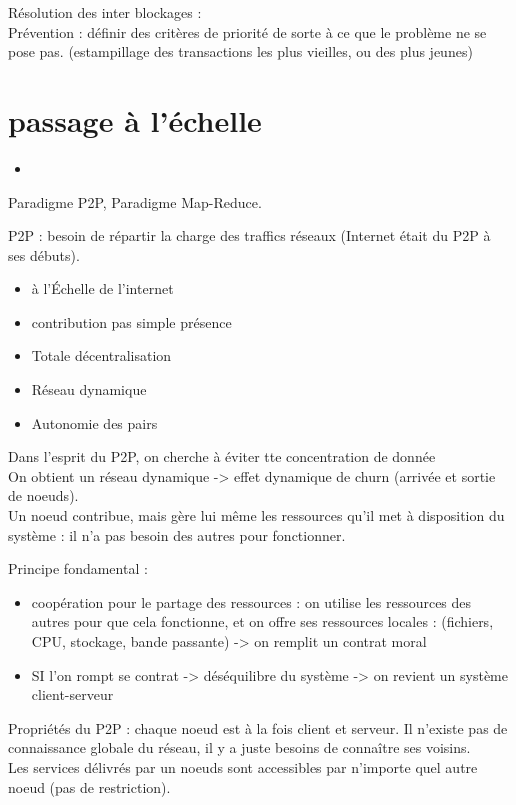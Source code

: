 {Résolution des inter blockages :\\
Prévention : définir des critères de priorité de sorte à ce que le problème ne se pose pas. (estampillage des transactions les plus vieilles, ou des plus jeunes)


\newpage

\section{passage à l'échelle}\begin{itemize}
	\item 
\end{itemize}

Paradigme P2P, Paradigme Map-Reduce.

P2P : besoin de répartir la charge des traffics réseaux (Internet était du P2P à ses débuts).
\begin{itemize}
	\item à l'Échelle de l'internet
	\item contribution pas simple présence
	\item Totale décentralisation
	\item Réseau dynamique
	\item Autonomie des pairs
\end{itemize}
Dans l'esprit du P2P, on cherche à éviter tte concentration de donnée\\
On obtient un réseau dynamique -> effet dynamique de churn (arrivée et sortie de noeuds).\\
Un noeud contribue, mais gère lui même les ressources qu'il met à disposition du système : il n'a pas besoin des autres pour fonctionner.


Principe fondamental :
\begin{itemize}
	\item coopération pour le partage des ressources : on utilise les ressources des autres pour que cela fonctionne, et on offre ses ressources locales : (fichiers, CPU, stockage, bande passante) -> on remplit un contrat moral
	\item SI l'on rompt se contrat -> déséquilibre du système -> on revient un système client-serveur
\end{itemize}

Propriétés du P2P : chaque noeud est à la fois client et serveur. Il n'existe pas de connaissance globale du réseau, il y a juste besoins de connaître ses voisins.\\
Les services délivrés par un noeuds sont accessibles par n'importe quel autre noeud (pas de restriction).\\

}
